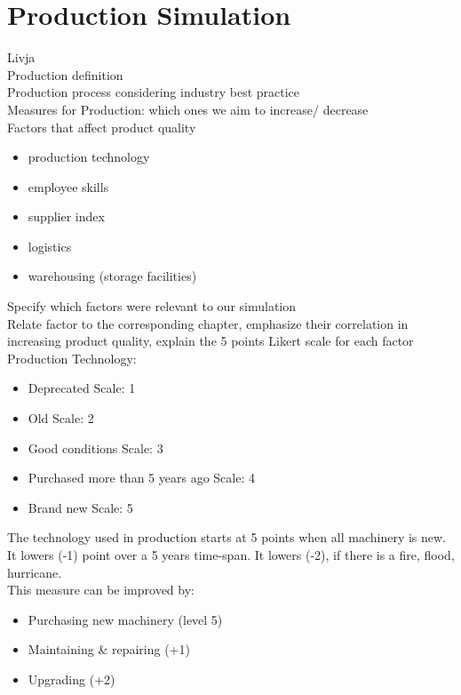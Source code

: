 \documentclass[11pt,titlepage,oneside,openany]{book}
\begin{document}


\section{Production Simulation}
\label{sec:products}
Livja \\
 Production definition \\
Production process considering industry best practice \\
Measures for Production: which ones we aim to increase/ decrease \\
 Factors that affect product quality 
\begin{itemize}
\item production technology
\item employee skills
\item supplier index
\item logistics
\item warehousing (storage facilities)
\end{itemize}
Specify which factors were relevant to our simulation \\
Relate factor to the corresponding chapter, emphasize their correlation in increasing product quality, explain the 5 points Likert scale for each factor\\
Production Technology: 
\begin{itemize}
    \item Deprecated                  Scale: 1
    \item Old                         Scale: 2
    \item Good conditions             Scale: 3
    \item Purchased more than 5 years ago Scale: 4
    \item Brand new                   Scale: 5

\end{itemize}
The technology used in production starts at 5 points when all machinery is new. It lowers (-1) point over a 5 years time-span. It lowers (-2), if there is a fire, flood, hurricane.\\
This measure can be improved by:
\begin{itemize}
    \item Purchasing new machinery (level 5)
\item Maintaining \& repairing (+1)
\item Upgrading (+2)
\end{itemize}
\end{document}
